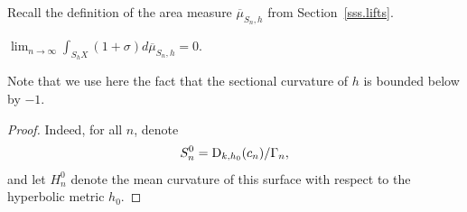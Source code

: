 Recall the definition of the area measure $\overline{\mu}_{S_n,h}$ from Section~\ref{sss.lifts}.

\begin{lemma}\label{l.sect_approaches-1}
$\displaystyle\lim_{n\to\infty} \int_{S_hX}(1+\sigma)d\overline{\mu}_{S_n,h}=0$.
\end{lemma}

\begin{remark}
Note that we use here the fact that the sectional curvature of $h$ is bounded below by $-1$.
\end{remark}

\begin{proof}
Indeed, for all $n$, denote\vspace*{-3pt}
\begin{equation*}
S_n^0=\text D_{k,h_0}(c_n)/\Gamma_n,
\end{equation*}
and let $H_n^0$ denote the mean curvature of this surface with respect to the hyperbolic metric $h_0$.


\end{proof}
